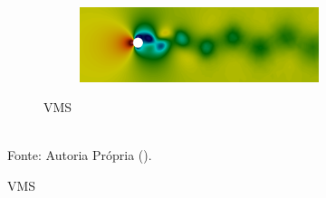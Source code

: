 \begin{figure}[h!]
\begin{subfigure}{\textwidth}
\begin{subfigure}{.49\textwidth}
        \end{subfigure}
        \begin{subfigure}{.49\textwidth}
            \includegraphics[width=\linewidth]{Figuras/cylinder/analise2/VMS-Qua-p.png}
        \end{subfigure}
        \caption{VMS}
    \end{subfigure}
    \\Fonte: Autoria Própria (\the\year).
    \label{fig:vel-pre-Qua}
\end{figure}

